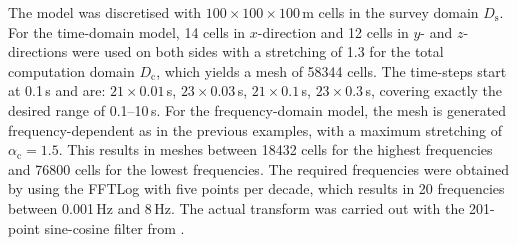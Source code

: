 \documentclass[extra, camera,%
    onecolumn,   %
    referee,     %
]{gji}
\newcommand{\mr}[1]{\mathrm{#1}}
\begin{document}
The model was discretised with $100\times100\times100\,$m cells in the survey
domain $D_\mr{s}$. For the time-domain model, 14 cells in $x$-direction and 12
cells in $y$- and $z$-directions were used on both sides with a stretching of
1.3 for the total computation domain $D_\mr{c}$, which yields a mesh of
\num{58344} cells. The time-steps start at 0.1\,s and are: $21\times0.01\,$s,
$23\times0.03\,$s, $21\times0.1\,$s, $23\times0.3\,$s, covering exactly the
desired range of 0.1--10\,s. For the frequency-domain model, the mesh is
generated frequency-dependent as in the previous examples, with a maximum
stretching of $\alpha_\mr{c}=1.5$. This results in meshes between \num{18432}
cells for the highest frequencies and \num{76800} cells for the lowest
frequencies. The required frequencies were obtained by using the FFTLog with
five points per decade, which results in 20 frequencies between 0.001\,Hz and
8\,Hz. The actual transform was carried out with the 201-point sine-cosine
filter from \cite{GEO.09.Key}.
\end{document}
